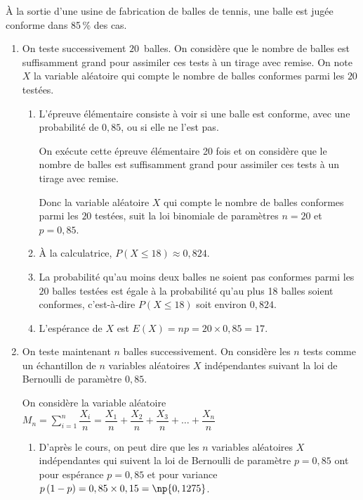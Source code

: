 À la sortie d'une usine de fabrication de balles de tennis, une balle est jugée conforme dans 85\,\% des cas.


\begin{enumerate}
\item On teste successivement $20$~balles. On considère que le nombre de balles est suffisamment grand pour assimiler ces tests à un tirage avec remise. On note $X$ la variable aléatoire qui compte le nombre de balles conformes parmi les $20$ testées.
	\begin{enumerate}
		\item %
L'épreuve élémentaire consiste à voir si une balle est conforme, avec une probabilité de $0,85$, ou si elle ne l'est pas.

On exécute cette épreuve élémentaire 20 fois et on  considère que le nombre de balles est suffisamment grand pour assimiler ces tests à un tirage avec remise.

Donc la variable aléatoire $X$ qui compte le nombre de balles conformes parmi les $20$ testées, suit la loi binomiale de paramètres $n=20$ et $p=0,85$.
		
		\item À la calculatrice,  $P\left (X \leqslant 18\right ) \approx 0,824$.
		
		\item La probabilité qu'au moins deux balles ne soient pas conformes parmi les $20$ balles testées est  égale à la probabilité qu'au plus 18 balles soient conformes, c'est-à-dire $P\left (X\leqslant18\right )$ soit environ $0,824$.
		
		
		\item L'espérance de $X$ est $E(X)=np=20\times 0,85=17$.
	\end{enumerate}
	
\item On teste maintenant $n$ balles successivement. On considère les $n$ tests comme un échantillon de $n$ variables aléatoires $X$ indépendantes suivant la loi de Bernoulli de paramètre $0,85$.
	
On considère la variable aléatoire
	$M_n = \displaystyle\sum_{i=1}^n \dfrac{X_i}{n} = \dfrac{X_1}{n} + \dfrac{X_2}{n} + \dfrac{X_3}{n} + \ldots + \dfrac{X_n}{n}$

	\begin{enumerate}
		\item %
D'après le cours, on peut dire que les  $n$ variables aléatoires $X$ indépendantes qui suivent la loi de Bernoulli de paramètre $p=0,85$ ont pour espérance $p=0,85$ et pour variance $p\left (1-p\right )=0,85\times 0,15=\np{0,1275}$.


\end{enumerate}
\end{enumerate}
